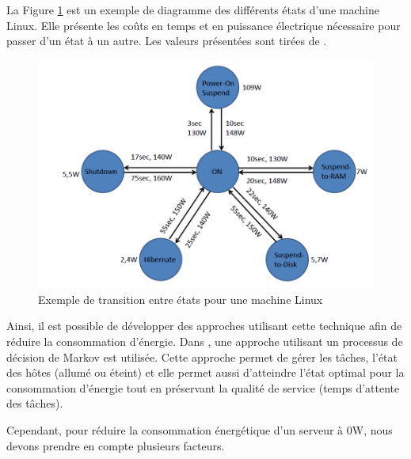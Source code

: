 \begin{onehalfspace}
La Figure \ref{EmachineLinux} est un exemple de diagramme des différents états d’une machine Linux. Elle présente les coûts en temps et en puissance électrique nécessaire pour passer d’un état à un autre. Les valeurs présentées sont tirées de \cite{ref17}.\medskip
\clearpage
\begin{figure}[!htb]
\begin{center}
\includegraphics[scale=0.45]{figures/3.png} 
\end{center}
\caption{Exemple de transition entre états pour une machine Linux}
\label{EmachineLinux}
\end{figure}

Ainsi, il est possible de développer des approches utilisant cette technique afin de réduire
la consommation d'énergie. Dans \cite{ref18}, une approche utilisant un processus de décision de Markov est utilisée. Cette approche permet de  gérer les tâches,  l’état des hôtes (allumé ou éteint) et elle permet aussi d’atteindre l’état optimal pour la consommation d’énergie  tout en préservant la qualité de service (temps d’attente des tâches).\medskip

Cependant, pour réduire la consommation énergétique d'un serveur à 0W, nous devons prendre
en compte plusieurs facteurs.\medskip


\end{onehalfspace}
